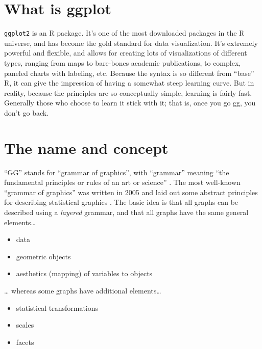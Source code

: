 \documentclass[
]{book}
\providecommand{\tightlist}{%
  \setlength{\itemsep}{0pt}\setlength{\parskip}{0pt}}
\begin{document}
\hypertarget{what-is-ggplot}{%
\section{What is ggplot}\label{what-is-ggplot}}

\texttt{ggplot2} is an R package. It's one of the most downloaded packages in the R universe, and has become the gold standard for data visualization. It's extremely powerful and flexible, and allows for creating lots of visualizations of different types, ranging from maps to bare-bones academic publications, to complex, paneled charts with labeling, etc. Because the syntax is so different from ``base'' R, it can give the impression of having a somewhat steep learning curve. But in reality, because the principles are so conceptually simple, learning is fairly fast. Generally those who choose to learn it stick with it; that is, once you go gg, you don't go back.

\hypertarget{the-name-and-concept}{%
\section{The name and concept}\label{the-name-and-concept}}

``GG'' stands for ``grammar of graphics'', with ``grammar'' meaning ``the fundamental principles or rules of an art or science'' \citep{layered-grammar}. The most well-known ``grammar of graphics'' was written in 2005 and laid out some abstract principles for describing statistical graphics \citep{10.5555/1088896}. The basic idea is that all graphs can be described using a \emph{layered} grammar, and that all graphs have the same general elements\ldots{}

\begin{itemize}
\tightlist
\item
  data
\item
  geometric objects
\item
  aesthetics (mapping) of variables to objects
\end{itemize}

\ldots{} whereas some graphs have additional elements\ldots{}

\begin{itemize}
\tightlist
\item
  statistical transformations
\item
  scales
\item
  facets
\end{itemize}
\end{document}
